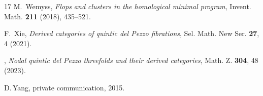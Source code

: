 \documentclass[a4paper,11pt, reqno]{amsart}
\theoremstyle{plain}
\theoremstyle{definition}
\numberwithin{equation}{section}
\begin{document}
\begin{thebibliography}{17}
M.~Wemyss, \emph{Flops and clusters in the homological minimal program},
  Invent. Math. {\bf 211} (2018), 435--521.

 F.~Xie, \emph{Derived categories of quintic del Pezzo fibrations}, Sel. Math. New Ser. {\bf 27}, 4 (2021).

 \bysame, \emph{Nodal quintic del Pezzo threefolds and their derived categories},  Math. Z. {\bf 304}, 48 (2023).

 D.\,Yang, private communication, 2015. 



\end{thebibliography}
\end{document}
